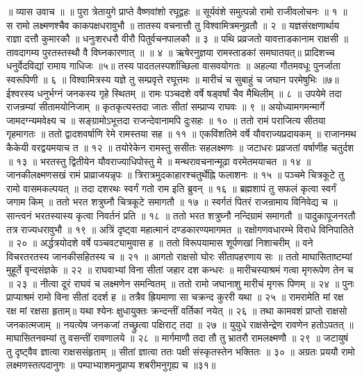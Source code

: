 ॥ व्यास उवाच ॥ ॥
पुरा त्रेतायुगे प्राप्ते वैष्णवांशो रघूद्वहः ॥
सूर्यवंशे समुत्पन्नो रामो राजीवलोचनः ॥ १ ॥
स रामो लक्ष्मणश्चैव काकपक्षधरावुभौ ॥
तातस्य वचनात्तौ तु विश्वामित्रमनुव्रतौ ॥ २ ॥
यज्ञसंरक्षणार्थाय राज्ञा दत्तौ कुमारकौ ॥
धनुःशरधरौ वीरौ पितुर्वचनपालकौ ॥ ३ ॥
पथि प्रव्रजतो यावत्ताडकानाम राक्षसी ॥
तावदागम्य पुरतस्तस्थौ वै विघ्नकारणात् ॥ ॥ ४ ॥
ऋषेरनुज्ञया रामस्ताडकां समघातयत्॥
प्रादिशच्च धनुर्वेदविद्यां रामाय गाधिजः ॥५॥
तस्य पादतलस्पर्शाच्छिला वासवयोगतः ॥
अहल्या गौतमवधूः पुनर्जाता स्वरूपिणी ॥ ६ ॥
विश्वामित्रस्य यज्ञे तु सम्प्रवृत्ते रघूत्तमः ॥
मारीचं च सुबाहुं च जघान परमेषुभिः ॥७॥
ईश्वरस्य धनुर्भग्नं जनकस्य गृहे स्थितम् ॥
रामः पञ्चदशे वर्षे षड्वर्षां चैव मैथिलीम् ॥ ८ ॥
उपयेमे तदा राजन्रम्यां सीतामयोनिजाम् ॥
कृतकृत्यस्तदा जातः सीतां सम्प्राप्य राघवः ॥ ९ ॥
अयोध्यामगमन्मार्गे जामदग्न्यमवेक्ष्य च ॥
सङ्ग्रामोऽभूत्तदा राजन्देवानामपि दुःसहः ॥ १० ॥
ततो रामं पराजित्य सीतया गृहमागतः ॥
ततो द्वादशवर्षाणि रेमे रामस्तया सह ॥ ११ ॥
एकविंशतिमे वर्षे यौवराज्यप्रदायकम् ॥
राजानमथ कैकेयी वरद्वयमयाच त ॥ १२ ॥
तयोरेकेन रामस्तु ससीतः सहलक्ष्मणः ॥
जटाधरः प्रव्रजतां वर्षाणीह चतुर्दश ॥ १३ ॥
भरतस्तु द्वितीयेन यौवराज्याधिपोस्तु मे ॥
मन्थरावचनान्मूढा वरमेतमयाचत ॥ १४ ॥
जानकीलक्ष्मणसखं रामं प्राव्राजयन्नृपः ॥
त्रिरात्रमुदकाहारश्चतुर्थेह्नि फलाशनः ॥ १५ ॥
पञ्चमे चित्रकूटे तु रामो वासमकल्पयत् ॥
तदा दशरथः स्वर्गं गतो राम इति ब्रुवन् ॥ १६ ॥
ब्रह्मशापं तु सफलं कृत्वा स्वर्गं जगाम किम् ॥
ततो भरत शत्रुघ्नौ चित्रकूटे समागतौ ॥ १७ ॥
स्वर्गतं पितरं राजन्रामाय विनिवेद्य च ॥
सान्त्वनं भरतस्यास्य कृत्वा निवर्तनं प्रति ॥ १८ ॥
ततो भरत शत्रुघ्नौ नन्दिग्रामं समागतौ ॥
पादुकापूजनरतौ तत्र राज्यधरावुभौ ॥ १९ ॥
अत्रिं दृष्ट्वा महात्मानं दण्डकारण्यमागमत ॥
रक्षोगणवधारम्भे विराधे विनिपातिते ॥ २० ॥
अर्द्धत्रयोदशे वर्षे पञ्चवट्यामुवास ह ॥
ततो विरूपयामास शूर्पणखां निशाचरीम् ॥
वने विचरतरतस्य जानकीसहितस्य च ॥ २१ ॥
आगतो राक्षसो घोरः सीतापहरणाय सः ॥
ततो माघासिताष्टम्यां मुहूर्ते वृन्दसंज्ञके ॥ २२ ॥
राघवाभ्यां विना सीतां जहार दश कन्धरः ॥
मारीचस्याश्रमं गत्वा मृगरूपेण तेन च ॥ २३ ॥
नीत्वा दूरं राघवं च लक्ष्मणेन समन्वितम् ॥
ततो रामो जघानाशु मारीचं मृगरू पिणम् ॥ २४ ॥
पुनः प्राप्याश्रमं रामो विना सीतां ददर्श ह ॥
तत्रैव ह्रियमाणा सा चक्रन्द कुररी यथा ॥ २५ ॥
रामरामेति मां रक्ष रक्ष मां रक्षसा हृताम्॥
यथा श्येनः क्षुधायु्क्तः क्रन्दन्तीं वर्तिकां नयेत् ॥ २६ ॥
तथा कामवशं प्राप्तो राक्षसो जनकात्मजाम् ॥
नयत्येष जनकजां तच्छ्रुत्वा पक्षिराट् तदा ॥ २७ ॥
युयुधे राक्षसेन्द्रेण रावणेन हतोऽपतत् ॥
माघासितनवम्यां तु वसन्तीं रावणालये ॥ २८ ॥
मार्गमाणौ तदा तौ तु भ्रातरौ रामलक्ष्मणौ ॥ २९ ॥
जटायुषं तु दृष्ट्वैव ज्ञात्वा राक्षससंहृताम् ॥
सीतां ज्ञात्वा ततः पक्षी संस्कृतस्तेन भक्तितः ॥ ३० ॥
अग्रतः प्रययौ रामो लक्ष्मणस्तत्पदानुगः ॥
पम्पाभ्याशमनुप्राप्य शबरीमनुगृह्य च ॥३१॥
